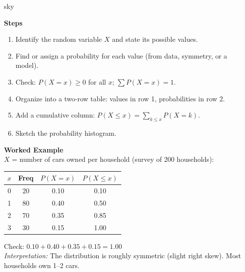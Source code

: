 \documentclass[10pt]{article}
\begin{document}
\begin{skillbox}{sky}
\begin{minipage}[t]{0.48\linewidth}
    \textbf{Steps}
    \begin{enumerate}
        \item Identify the random variable $X$ and state its possible values.
        \item Find or assign a probability for each value (from data, symmetry, or a model).
        \item Check: $P(X=x) \ge 0$ for all $x$; $\sum P(X=x) = 1$.
        \item Organize into a two-row table: values in row 1, probabilities in row 2.
        \item Add a cumulative column: $P(X \le x) = \sum_{k \le x} P(X=k)$.
        \item Sketch the probability histogram.
    \end{enumerate}
\end{minipage}
\hfill
\begin{minipage}[t]{0.48\linewidth}
    \textbf{Worked Example}\\
    $X$ = number of cars owned per household (survey of 200 households):
    \begin{center}
    \renewcommand{\arraystretch}{1.3}
    \small
    \begin{tabular}{@{}cccc@{}}
    $x$ & Freq & $P(X=x)$ & $P(X \le x)$ \\
    \hline
    0 & 20  & 0.10 & 0.10 \\
    1 & 80  & 0.40 & 0.50 \\
    2 & 70  & 0.35 & 0.85 \\
    3 & 30  & 0.15 & 1.00 \\
    \end{tabular}
    \end{center}
    Check: $0.10+0.40+0.35+0.15 = 1.00$ \checkmark\\[4pt]
    \textit{Interpretation:} The distribution is roughly symmetric (slight right skew).
    Most households own 1--2 cars.
\end{minipage}
\end{skillbox}
\end{document}
